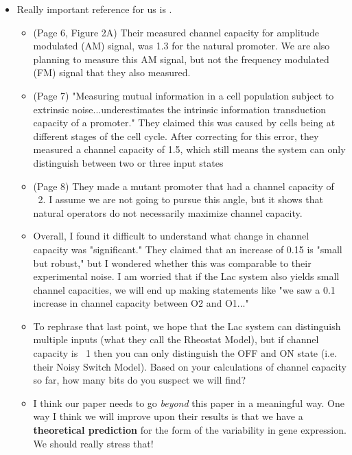 \begin{itemize}
	
	\item Really important reference for us is \cite{Hansen2015}.
		\begin{itemize}
			\item (Page 6, Figure 2A) Their measured channel capacity for amplitude modulated (AM) signal, was 1.3 for the natural promoter. We are also planning to measure this AM signal, but not the frequency modulated (FM) signal that they also measured.
			\item (Page 7) "Measuring mutual information in a cell population subject to extrinsic noise...underestimates the intrinsic information transduction capacity of a promoter." They claimed this was caused by cells being at different stages of the cell cycle. After correcting for this error, they measured a channel capacity of 1.5, which still means the system can only distinguish between two or three input states
			\item (Page 8) They made a mutant promoter that had a channel capacity of ~2. I assume we are not going to pursue this angle, but it shows that natural operators do not necessarily maximize channel capacity.
			\item Overall, I found it difficult to understand what change in channel capacity was "significant." They claimed that an increase of 0.15 is "small but robust," but I wondered whether this was comparable to their experimental noise. I am worried that if the Lac system also yields small channel capacities, we will end up making statements like "we saw a 0.1 increase in channel capacity between O2 and O1..."
			\item To rephrase that last point, we hope that the Lac system can distinguish multiple inputs (what they call the Rheostat Model), but if channel capacity is ~1 then you can only distinguish the OFF and ON state (i.e. their Noisy Switch Model). Based on your calculations of channel capacity so far, how many bits do you suspect we will find?
			\item I think our paper needs to go \textit{beyond} this paper in a meaningful way. One way I think we will improve upon their results is that we have a \textbf{theoretical prediction} for the form of the variability in gene expression. We should really stress that!
		\end{itemize}
	

\end{itemize}
